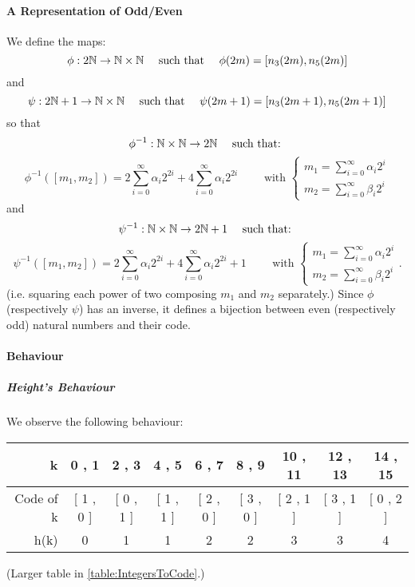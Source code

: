 \paragraph{A Representation of Odd/Even}
We define the maps:
$$
\phi: 2\mathbb{N} \to \mathbb{N} \times \mathbb{N}
\quad \text{ such that } \quad 
\phi(2m) = \left[ n_3(2m), n_5(2m) \right]
$$
and
$$
\psi: 2\mathbb{N}+1 \to \mathbb{N} \times \mathbb{N}
\quad \text{ such that } \quad 
\psi(2m+1) = \left[ n_3(2m+1), n_5(2m+1) \right]
$$
so that 
$$\phi^{-1}: \mathbb{N} \times \mathbb{N} \to 2\mathbb{N} \quad \text{ such that: } $$
$$
\phi^{-1}(\left[ m_1, m_2 \right])
= 2\sum_{i=0}^{\infty} \alpha_i 2^{2i}
+ 4\sum_{i=0}^{\infty} \alpha_i 2^{2i}
\qquad \text{ with } \left\lbrace \begin{array}{c}
m_1 = \sum_{i=0}^{\infty} \alpha_i 2^i \\
m_2 = \sum_{i=0}^{\infty} \beta_i 2^i
\end{array} \right.
$$
and
$$\psi^{-1}: \mathbb{N} \times \mathbb{N} \to 2\mathbb{N}+1 \quad \text{ such that: } $$
$$
\psi^{-1}(\left[ m_1, m_2 \right])
= 2\sum_{i=0}^{\infty} \alpha_i 2^{2i} 
+ 4\sum_{i=0}^{\infty} \alpha_i 2^{2i}
+ 1
\qquad \text{ with } \left\lbrace \begin{array}{c}
	m_1 = \sum_{i=0}^{\infty} \alpha_i 2^i \\
	m_2 = \sum_{i=0}^{\infty} \beta_i 2^i
\end{array} \right..
$$
(i.e. squaring each power of two composing $m_1$ and $m_2$ separately.)
Since $\phi$ (respectively $\psi$) has an inverse, it defines a bijection between even (respectively odd) natural numbers and their code.

\paragraph{Behaviour}
\subparagraph{Height's Behaviour}
We observe the following behaviour:
\begin{center}
	\begin{tabular}{|r||c|c|c|c|c|c|c|c|}
		\hline
		\textbf{k} & \textbf{0 , 1} & \textbf{2 , 3} & \textbf{4 , 5} & \textbf{6 , 7} & \textbf{8 , 9} & \textbf{10 , 11} & \textbf{12 , 13} & \textbf{14 , 15} \\
		\hline \hline
		Code of k & [ 1 , 0 ] & [ 0 , 1 ] & [ 1 , 1 ] & [ 2 , 0 ] & [ 3 , 0 ] & [ 2 , 1 ] & [ 3 , 1 ] & [ 0 , 2 ] \\
		\hline
		h(k) & 0 & 1 & 1 & 2 & 2 & 3 & 3 & 4 \\
		\hline
	\end{tabular}

	(Larger table in \ref{table:IntegersToCode}.)
\end{center}


